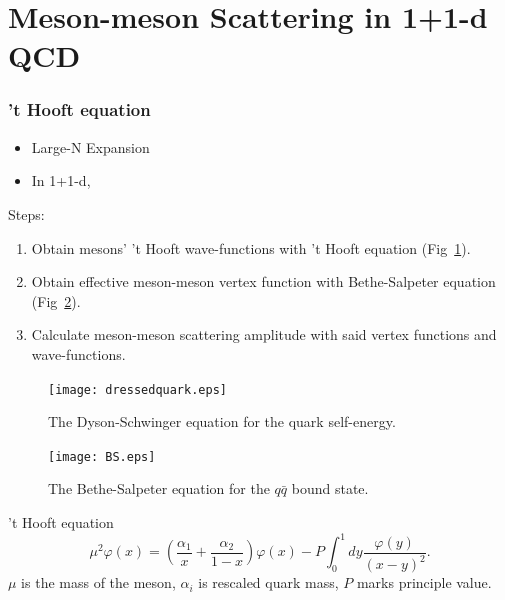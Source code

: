 \section{Meson-meson Scattering in 1+1-d QCD}
\begin{frame}
	\frametitle{'t Hooft equation}

	
	\begin{minipage}{0.48\textwidth}
		\begin{itemize}
			\item Large-N Expansion
			\item In 1+1-d, 
		\end{itemize}
	Steps: 
	\begin{enumerate}
		\item \small Obtain mesons' 't Hooft wave-functions with 't Hooft equation (Fig~\ref{dressedquark}). 
		\item Obtain effective meson-meson vertex function with Bethe-Salpeter equation (Fig~\ref{BSequation}). 
		\item Calculate meson-meson scattering amplitude with said vertex functions and wave-functions. 
	\end{enumerate}
	\end{minipage}
	\begin{minipage}{0.48\textwidth}
		\begin{figure}[hbt]
			\begin{center}
			  \texttt{[image: dressedquark.eps]}\\
			  \caption{The Dyson-Schwinger equation for the quark self-energy. }\label{dressedquark}
			  \end{center}
		\end{figure}
		\begin{figure}[hbt]
			\begin{center}
			  \texttt{[image: BS.eps]}\\
			  \caption{The Bethe-Salpeter equation for the $q\bar{q}$ bound state.}\label{BSequation}
			  \end{center}
		\end{figure}
	\end{minipage}

	\vspace*{1mm}

	't Hooft equation
	\begin{equation}
		\mu^2
		\varphi(x)=\left(\frac{\alpha_{1}}{x}+\frac{\alpha_{2}}{1-x}\right)\varphi(x)-P\int_0^1
		dy\frac{\varphi(y)}{(x-y)^2}.\label{teq}
	\end{equation}
	$\mu$ is the mass of the meson, $\alpha_i$ is rescaled quark mass, $P$ marks principle value. 

\end{frame}
